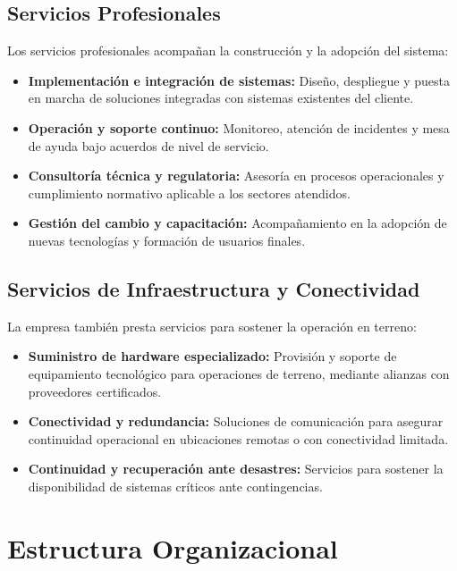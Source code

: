 \subsection{Servicios Profesionales}

Los servicios profesionales acompañan la construcción y la adopción del sistema:

\begin{itemize}
    \item \textbf{Implementación e integración de sistemas:} Diseño, despliegue y puesta en marcha de soluciones integradas con sistemas existentes del cliente.
    \item \textbf{Operación y soporte continuo:} Monitoreo, atención de incidentes y mesa de ayuda bajo acuerdos de nivel de servicio.
    \item \textbf{Consultoría técnica y regulatoria:} Asesoría en procesos operacionales y cumplimiento normativo aplicable a los sectores atendidos.
    \item \textbf{Gestión del cambio y capacitación:} Acompañamiento en la adopción de nuevas tecnologías y formación de usuarios finales.
\end{itemize}

\subsection{Servicios de Infraestructura y Conectividad}

La empresa también presta servicios para sostener la operación en terreno:

\begin{itemize}
    \item \textbf{Suministro de hardware especializado:} Provisión y soporte de equipamiento tecnológico para operaciones de terreno, mediante alianzas con proveedores certificados.
    \item \textbf{Conectividad y redundancia:} Soluciones de comunicación para asegurar continuidad operacional en ubicaciones remotas o con conectividad limitada.
    \item \textbf{Continuidad y recuperación ante desastres:} Servicios para sostener la disponibilidad de sistemas críticos ante contingencias.
\end{itemize}

\section{Estructura Organizacional}

